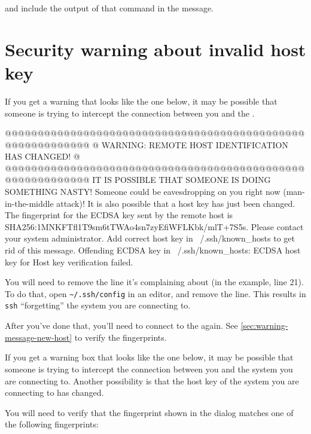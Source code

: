and include the output of that command in the message.
\fi

\section{Security warning about invalid host key}
\label{sec:security-warning-invald-host-key}

\ifmacORlinux

If you get a warning that looks like the one below, it may be possible
that someone is trying to intercept the connection between you and the \hpc.

\begin{prompt}
@@@@@@@@@@@@@@@@@@@@@@@@@@@@@@@@@@@@@@@@@@@@@@@@@@@@@@@@@@@
@    WARNING: REMOTE HOST IDENTIFICATION HAS CHANGED!     @
@@@@@@@@@@@@@@@@@@@@@@@@@@@@@@@@@@@@@@@@@@@@@@@@@@@@@@@@@@@
IT IS POSSIBLE THAT SOMEONE IS DOING SOMETHING NASTY!
Someone could be eavesdropping on you right now (man-in-the-middle attack)!
It is also possible that a host key has just been changed.
The fingerprint for the ECDSA key sent by the remote host is
SHA256:1MNKFTfl1T9sm6tTWAo4sn7zyEfiWFLKbk/mlT+7S5s.
Please contact your system administrator.
Add correct host key in ~/.ssh/known_hosts to get rid of this message.
Offending ECDSA key in ~/.ssh/known_hosts:%
ECDSA host key for %
Host key verification failed.
\end{prompt}

You will need to remove the line it's complaining about (in the example, line 21).
To do that, open \verb|~/.ssh/config| in an editor, and remove the line. This
results in \verb|ssh| ``forgetting'' the system you are connecting to.

After you've done that, you'll need to connect to the \hpc again.
See \autoref{sec:warning-message-new-host} to verify the fingerprints.

\else

If you get a warning box that looks like the one below, it may be possible
that someone is trying to intercept the connection between you and the system you are connecting to.
Another possibility is that the host key of the system you are connecting to has changed.

You will need to verify that the fingerprint shown in the dialog matches one of the
following fingerprints:

